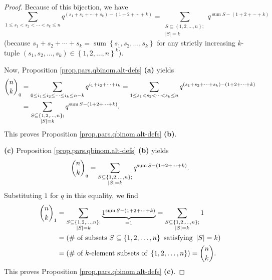 \begin{proof}
Because of this bijection, we have%
\[
\sum_{1\leq s_{1}<s_{2}<\cdots<s_{k}\leq n}q^{\left(  s_{1}+s_{2}+\cdots
+s_{k}\right)  -\left(  1+2+\cdots+k\right)  }=\sum_{\substack{S\subseteq
\left\{  1,2,\ldots,n\right\}  ;\\\left\vert S\right\vert =k}%
}q^{\operatorname*{sum}S-\left(  1+2+\cdots+k\right)  }%
\]
(because $s_{1}+s_{2}+\cdots+s_{k}=\operatorname*{sum}\left\{  s_{1}%
,s_{2},\ldots,s_{k}\right\}  $ for any strictly increasing $k$-tuple $\left(
s_{1},s_{2},\ldots,s_{k}\right)  \in\left\{  1,2,\ldots,n\right\}  ^{k}$).

Now, Proposition \ref{prop.pars.qbinom.alt-defs} \textbf{(a)} yields%
\begin{align*}
\dbinom{n}{k}_{q}  &  =\sum_{0\leq i_{1}\leq i_{2}\leq\cdots\leq i_{k}\leq
n-k}q^{i_{1}+i_{2}+\cdots+i_{k}}=\sum_{1\leq s_{1}<s_{2}<\cdots<s_{k}\leq
n}q^{\left(  s_{1}+s_{2}+\cdots+s_{k}\right)  -\left(  1+2+\cdots+k\right)
}\\
&  =\sum_{\substack{S\subseteq\left\{  1,2,\ldots,n\right\}  ;\\\left\vert
S\right\vert =k}}q^{\operatorname*{sum}S-\left(  1+2+\cdots+k\right)  }.
\end{align*}
This proves Proposition \ref{prop.pars.qbinom.alt-defs} \textbf{(b)}. \medskip

\textbf{(c)} Proposition \ref{prop.pars.qbinom.alt-defs} \textbf{(b)} yields
\[
\dbinom{n}{k}_{q}=\sum_{\substack{S\subseteq\left\{  1,2,\ldots,n\right\}
;\\\left\vert S\right\vert =k}}q^{\operatorname*{sum}S-\left(  1+2+\cdots
+k\right)  }.
\]
Substituting $1$ for $q$ in this equality, we find%
\begin{align*}
\dbinom{n}{k}_{1}  &  =\sum_{\substack{S\subseteq\left\{  1,2,\ldots
,n\right\}  ;\\\left\vert S\right\vert =k}}\underbrace{1^{\operatorname*{sum}%
S-\left(  1+2+\cdots+k\right)  }}_{=1}=\sum_{\substack{S\subseteq\left\{
1,2,\ldots,n\right\}  ;\\\left\vert S\right\vert =k}}1\\
&  =\left(  \text{\# of subsets }S\subseteq\left\{  1,2,\ldots,n\right\}
\text{ satisfying }\left\vert S\right\vert =k\right) \\
&  =\left(  \text{\# of }k\text{-element subsets of }\left\{  1,2,\ldots
,n\right\}  \right)  =\dbinom{n}{k}.
\end{align*}
This proves Proposition \ref{prop.pars.qbinom.alt-defs} \textbf{(c)}.
\end{proof}

